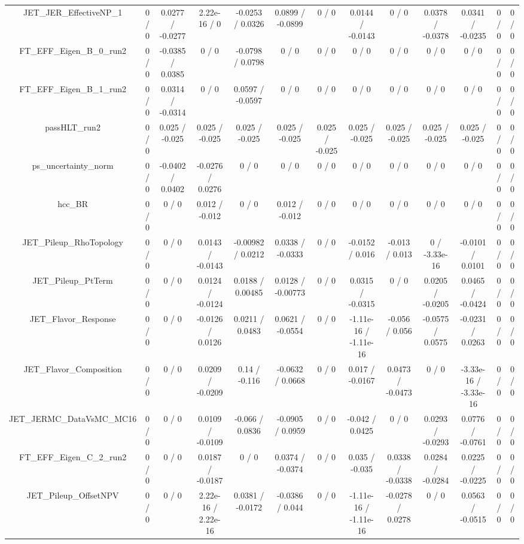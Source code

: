 \documentclass[10pt]{article}
\begin{document}
\begin{table}[htbp]
\begin{center}
\begin{tabular}{|c|c|c|c|c|c|c|c|c|c|c|c|c|}
  JET_JER_EffectiveNP_1 & 0 / 0 & 0.0277 / -0.0277 & 2.22e-16 / 0 & -0.0253 / 0.0326 & 0.0899 / -0.0899 & 0 / 0 & 0.0144 / -0.0143 & 0 / 0 & 0.0378 / -0.0378 & 0.0341 / -0.0235 & 0 / 0 & 0 / 0 \\ 
  FT_EFF_Eigen_B_0_run2 & 0 / 0 & -0.0385 / 0.0385 & 0 / 0 & -0.0798 / 0.0798 & 0 / 0 & 0 / 0 & 0 / 0 & 0 / 0 & 0 / 0 & 0 / 0 & 0 / 0 & 0 / 0 \\ 
  FT_EFF_Eigen_B_1_run2 & 0 / 0 & 0.0314 / -0.0314 & 0 / 0 & 0.0597 / -0.0597 & 0 / 0 & 0 / 0 & 0 / 0 & 0 / 0 & 0 / 0 & 0 / 0 & 0 / 0 & 0 / 0 \\ 
  passHLT_run2 & 0 / 0 & 0.025 / -0.025 & 0.025 / -0.025 & 0.025 / -0.025 & 0.025 / -0.025 & 0.025 / -0.025 & 0.025 / -0.025 & 0.025 / -0.025 & 0.025 / -0.025 & 0.025 / -0.025 & 0 / 0 & 0 / 0 \\ 
  ps_uncertainty_norm & 0 / 0 & -0.0402 / 0.0402 & -0.0276 / 0.0276 & 0 / 0 & 0 / 0 & 0 / 0 & 0 / 0 & 0 / 0 & 0 / 0 & 0 / 0 & 0 / 0 & 0 / 0 \\ 
  hcc_BR & 0 / 0 & 0 / 0 & 0.012 / -0.012 & 0 / 0 & 0.012 / -0.012 & 0 / 0 & 0 / 0 & 0 / 0 & 0 / 0 & 0 / 0 & 0 / 0 & 0 / 0 \\ 
  JET_Pileup_RhoTopology & 0 / 0 & 0 / 0 & 0.0143 / -0.0143 & -0.00982 / 0.0212 & 0.0338 / -0.0333 & 0 / 0 & -0.0152 / 0.016 & -0.013 / 0.013 & 0 / -3.33e-16 & -0.0101 / 0.0101 & 0 / 0 & 0 / 0 \\ 
  JET_Pileup_PtTerm & 0 / 0 & 0 / 0 & 0.0124 / -0.0124 & 0.0188 / 0.00485 & 0.0128 / -0.00773 & 0 / 0 & 0.0315 / -0.0315 & 0 / 0 & 0.0205 / -0.0205 & 0.0465 / -0.0424 & 0 / 0 & 0 / 0 \\ 
  JET_Flavor_Response & 0 / 0 & 0 / 0 & -0.0126 / 0.0126 & 0.0211 / 0.0483 & 0.0621 / -0.0554 & 0 / 0 & -1.11e-16 / -1.11e-16 & -0.056 / 0.056 & -0.0575 / 0.0575 & -0.0231 / 0.0263 & 0 / 0 & 0 / 0 \\ 
  JET_Flavor_Composition & 0 / 0 & 0 / 0 & 0.0209 / -0.0209 & 0.14 / -0.116 & -0.0632 / 0.0668 & 0 / 0 & 0.017 / -0.0167 & 0.0473 / -0.0473 & 0 / 0 & -3.33e-16 / -3.33e-16 & 0 / 0 & 0 / 0 \\ 
  JET_JERMC_DataVsMC_MC16 & 0 / 0 & 0 / 0 & 0.0109 / -0.0109 & -0.066 / 0.0836 & -0.0905 / 0.0959 & 0 / 0 & -0.042 / 0.0425 & 0 / 0 & 0.0293 / -0.0293 & 0.0776 / -0.0761 & 0 / 0 & 0 / 0 \\ 
  FT_EFF_Eigen_C_2_run2 & 0 / 0 & 0 / 0 & 0.0187 / -0.0187 & 0 / 0 & 0.0374 / -0.0374 & 0 / 0 & 0.035 / -0.035 & 0.0338 / -0.0338 & 0.0284 / -0.0284 & 0.0225 / -0.0225 & 0 / 0 & 0 / 0 \\ 
  JET_Pileup_OffsetNPV & 0 / 0 & 0 / 0 & 2.22e-16 / 2.22e-16 & 0.0381 / -0.0172 & -0.0386 / 0.044 & 0 / 0 & -1.11e-16 / -1.11e-16 & -0.0278 / 0.0278 & 0 / 0 & 0.0563 / -0.0515 & 0 / 0 & 0 / 0 \\ 

\end{tabular}
\end{center}
\end{table}
\end{document}
